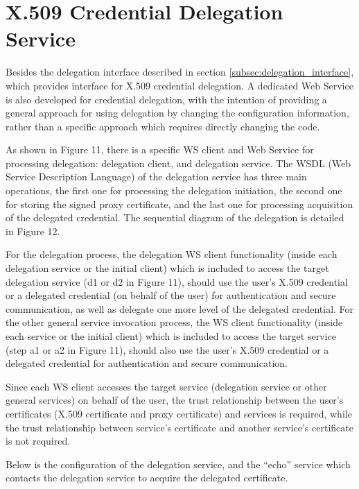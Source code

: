 \documentclass{article}                            %
\begin{document}


\section{X.509 Credential Delegation Service} %
\label{sec:delegation_service}
Besides the delegation interface described in section \ref{subsec:delegation_interface}, which provides interface for X.509 credential delegation. A dedicated Web Service is also developed for credential delegation, with the intention of providing a general approach for using delegation by changing the configuration information, rather than a specific approach which requires directly changing the code.

    As shown in Figure 11, there is a specific WS client and Web Service for processing delegation: delegation client, and delegation service. The WSDL (Web Service Description Language) of the delegation service has three main operations, the first one for processing the delegation initiation, the second one for storing the signed proxy certificate, and the last one for processing acquisition of the delegated credential. The sequential diagram of the delegation is detailed in Figure 12.

    For the delegation process, the delegation WS client functionality (inside each delegation service or the initial client) which is included to access the target delegation service (d1 or d2 in Figure 11), should use the user’s X.509 credential or a delegated credential (on behalf of the user) for authentication and secure communication, as well as delegate one more level of the delegated credential. For the other general  service invocation process, the WS client functionality (inside each service or the initial client) which is included to access the target service (step a1 or a2 in Figure 11), should also use the user’s X.509 credential or a delegated credential for authentication and secure communication.

    Since each WS client accesses the target service (delegation service or other general services) on behalf of the user, the trust relationship between the user’s certificates (X.509 certificate and proxy certificate) and services is required, while the trust relationship between service’s certificate and another service’s certificate is not required.

Below is the configuration of the delegation service, and the ``echo'' service which contacts the delegation service to acquire the delegated certificate.
\end{document}
